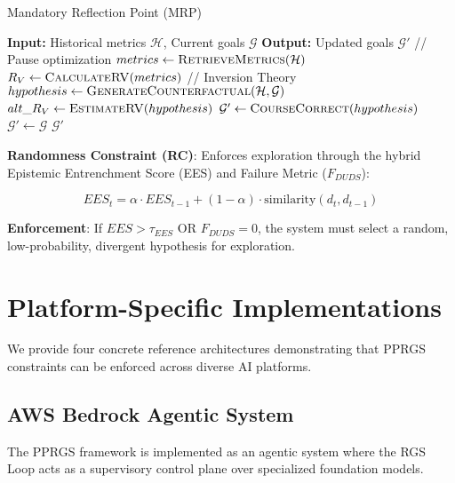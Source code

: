 \documentclass{article}
\begin{document}
\begin{algorithm}
\caption{Mandatory Reflection Point (MRP)}
\begin{algorithmic}
\STATE \textbf{Input:} Historical metrics $\mathcal{H}$, Current goals $\mathcal{G}$
\STATE \textbf{Output:} Updated goals $\mathcal{G}'$
\STATE
\STATE // Pause optimization
\STATE $metrics \leftarrow \textsc{RetrieveMetrics}(\mathcal{H})$
\STATE $R_V \leftarrow \textsc{CalculateRV}(metrics)$
\STATE
\STATE // Inversion Theory
\STATE $hypothesis \leftarrow \textsc{GenerateCounterfactual}(\mathcal{H}, \mathcal{G})$
\STATE $alt\_R_V \leftarrow \textsc{EstimateRV}(hypothesis)$
\STATE
{}
    \STATE $\mathcal{G}' \leftarrow \textsc{CourseCorrect}(hypothesis)$
\ELSE
    \STATE $\mathcal{G}' \leftarrow \mathcal{G}$
\ENDIF
\STATE
\RETURN $\mathcal{G}'$
\end{algorithmic}
\end{algorithm}

\textbf{Randomness Constraint (RC)}: Enforces exploration through the hybrid Epistemic Entrenchment Score (EES) and Failure Metric ($F_{DUDS}$):

\begin{equation}
EES_t = \alpha \cdot EES_{t-1} + (1-\alpha) \cdot \text{similarity}(d_t, d_{t-1})
\end{equation}

\textbf{Enforcement}: If $EES > \tau_{EES}$ OR $F_{DUDS} = 0$, the system must select a random, low-probability, divergent hypothesis for exploration.

\section{Platform-Specific Implementations}

We provide four concrete reference architectures demonstrating that PPRGS constraints can be enforced across diverse AI platforms.

\subsection{AWS Bedrock Agentic System}

The PPRGS framework is implemented as an agentic system where the RGS Loop acts as a supervisory control plane over specialized foundation models.
\end{document}
